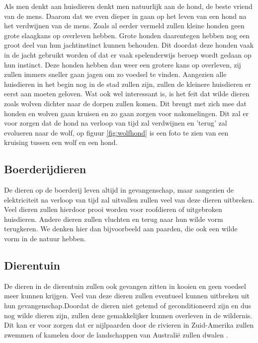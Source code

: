 Als men denkt aan huisdieren denkt men natuurlijk aan de hond, de beste vriend van de mens. Daarom dat we even dieper in gaan op het leven van een hond na het verdwijnen van de mens. Zoals al eerder vermeld zullen kleine honden geen grote slaagkans op overleven hebben. Grote honden daarentegen hebben nog een groot deel van hun jachtinstinct kunnen behouden. Dit doordat deze honden vaak in de jacht gebruikt worden of dat er vaak spelenderwijs beroep wordt gedaan op hun instinct. Deze honden hebben dan weer een grotere kans op overleven, zij zullen immers sneller gaan jagen om zo voedsel te vinden. Aangezien alle huisdieren in het begin nog in de stad zullen zijn, zullen de kleinere huisdieren er eerst aan moeten geloven. Wat ook wel interessant is, is het feit dat wilde dieren zoals wolven dichter naar de dorpen zullen komen. Dit brengt met zich mee dat honden en wolven gaan kruisen en zo gaan zorgen voor nakomelingen. Dit zal er voor zorgen dat de hond na verloop van tijd zal verdwijnen en 'terug' zal evolueren naar de wolf, op figuur \ref{fig:wolfhond} is een foto te zien van een kruising tussen een wolf en een hond.
\subsection{Boerderijdieren}
De dieren op de boerderij leven altijd in gevangenschap, maar aangezien de elektriciteit na verloop van tijd zal uitvallen zullen veel van deze dieren uitbreken. Veel dieren zullen hierdoor prooi worden voor roofdieren of uitgebroken huisdieren. Andere dieren zullen vluchten en terug naar hun wilde vorm terugkeren. We denken hier dan bijvoorbeeld aan paarden, die ook een wilde vorm in de natuur hebben.
\subsection{Dierentuin}
De dieren in de dierentuin zullen ook gevangen zitten in kooien en geen voedsel meer kunnen krijgen. Veel van deze dieren zullen eventueel kunnen uitbreken uit hun gevangenschap.Doordat de dieren niet getemd of geconditioneerd zijn en dus nog wilde dieren zijn, zullen deze gemakkelijker kunnen overleven in de wildernis. Dit kan er voor zorgen dat er nijlpaarden door de rivieren in Zuid-Amerika zullen zwemmen of kamelen door de landschappen van Australi\"{e} zullen dwalen \cite{ASAPScience}.
